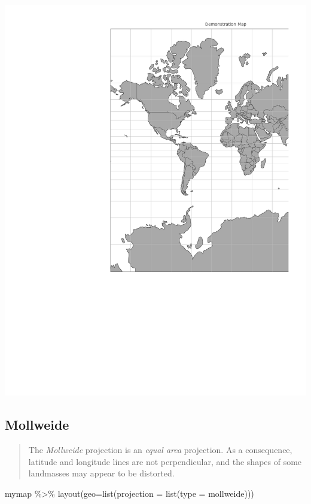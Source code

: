 \documentclass[
  letterpaper,
  DIV=11,
  numbers=noendperiod,
  oneside]{scrreprt}
\newenvironment{Shaded}{\begin{snugshade}}{\end{snugshade}}
\newcommand{\AttributeTok}[1]{\textcolor[rgb]{0.40,0.45,0.13}{#1}}
\newcommand{\FunctionTok}[1]{\textcolor[rgb]{0.28,0.35,0.67}{#1}}
\newcommand{\NormalTok}[1]{\textcolor[rgb]{0.00,0.23,0.31}{#1}}
\newcommand{\SpecialCharTok}[1]{\textcolor[rgb]{0.37,0.37,0.37}{#1}}
\newcommand{\StringTok}[1]{\textcolor[rgb]{0.13,0.47,0.30}{#1}}
\begin{document}
\includegraphics{projections_files/figure-pdf/unnamed-chunk-6-1.pdf}

\subsection{Mollweide}\label{mollweide}

\begin{quote}
The \emph{Mollweide} projection is an \emph{equal area} projection. As a
consequence, latitude and longitude lines are not perpendicular, and the
shapes of some landmasses may appear to be distorted.
\end{quote}

\begin{Shaded}
\begin{Highlighting}[]
\NormalTok{mymap }\SpecialCharTok{\%\textgreater{}\%} 
  \FunctionTok{layout}\NormalTok{(}\AttributeTok{geo=}\FunctionTok{list}\NormalTok{(}\AttributeTok{projection =} \FunctionTok{list}\NormalTok{(}\AttributeTok{type =} \StringTok{\textquotesingle{}mollweide\textquotesingle{}}\NormalTok{)))}
\end{Highlighting}
\end{Shaded}
\end{document}
